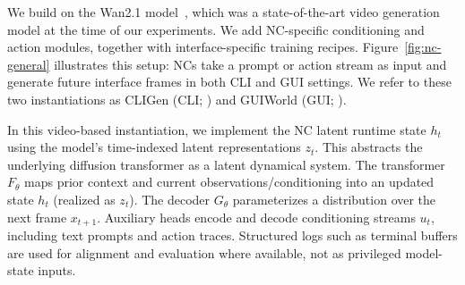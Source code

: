 We build on the Wan2.1 model~\citep{wan2025wan}, which was a state-of-the-art video generation model at the time of our experiments.
We add NC-specific conditioning and action modules, together with interface-specific training recipes.
Figure~\ref{fig:nc-general} illustrates this setup: NCs take a prompt or action stream as input and generate future interface frames in both CLI and GUI settings.
We refer to these two instantiations as CLIGen (CLI; ) and GUIWorld (GUI; ).

In this video-based instantiation, we implement the NC latent runtime state $h_t$ using the model’s time-indexed latent representations $z_t$.
This abstracts the underlying diffusion transformer as a latent dynamical system.
The transformer $F_\theta$ maps prior context and current observations/conditioning into an updated state $h_t$ (realized as $z_t$).
The decoder $G_\theta$ parameterizes a distribution over the next frame $x_{t+1}$.
Auxiliary heads encode and decode conditioning streams $u_t$, including text prompts and action traces.
Structured logs such as terminal buffers are used for alignment and evaluation where available, not as privileged model-state inputs.
